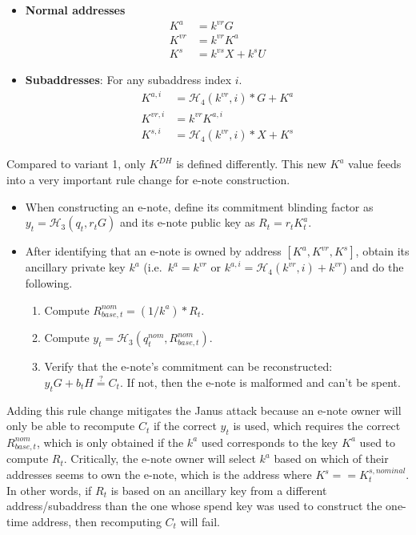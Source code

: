 \begin{itemize}
    \item \textbf{Normal addresses}
    \begin{align*}
        K^a &= k^{vr} G  \\
        K^{vr} &= k^{vr} K^a  \\
        K^{s} &= k^{vs} X + k^s U
    \end{align*}

    \item \textbf{Subaddresses}: For any subaddress index $i$.\vspace{.115cm}
    \begin{align*}
        K^{a,i} &= \mathcal{H}_4(k^{vr},i)*G + K^a  \\
        K^{vr,i} &= k^{vr} K^{a,i}  \\
        K^{s,i} &= \mathcal{H}_4(k^{vr},i)*X + K^s
    \end{align*}
\end{itemize}

Compared to variant 1, only $K^{DH}$ is defined differently. This new $K^a$ value feeds into a very important rule change for e-note construction.

\begin{itemize}
    \item When constructing an e-note, define its commitment blinding factor as $y_t = \mathcal{H}_3(q_t, r_t G)$ and its e-note public key as $R_t = r_t K^a_t$.

    \item After identifying that an e-note is owned by address $[K^a, K^{vr}, K^s]$, obtain its ancillary private key $k^a$ (i.e.\ $k^a = k^{vr}$ or $k^{a,i} = \mathcal{H}_4(k^{vr},i) + k^{vr}$) and do the following.
    \begin{enumerate}
        \item Compute $R^{nom}_{base,t} = (1/k^a)*R_t$.
        \item Compute $y_t = \mathcal{H}_3(q^{nom}_t, R^{nom}_{base,t})$.
        \item Verify that the e-note's commitment can be reconstructed: $y_t G + b_t H \stackrel{?}{=} C_t$. If not, then the e-note is malformed and can't be spent.
    \end{enumerate}
\end{itemize}

Adding this rule change mitigates the Janus attack because an e-note owner will only be able to recompute $C_t$ if the correct $y_t$ is used, which requires the correct $R^{nom}_{base,t}$, which is only obtained if the $k^a$ used corresponds to the key $K^a$ used to compute $R_t$. Critically, the e-note owner will select $k^a$ based on which of their addresses seems to own the e-note, which is the address where $K^s == K^{s,nominal}_t$. In other words, if $R_t$ is based on an ancillary key from a different address/subaddress than the one whose spend key was used to construct the one-time address, then recomputing $C_t$ will fail.


